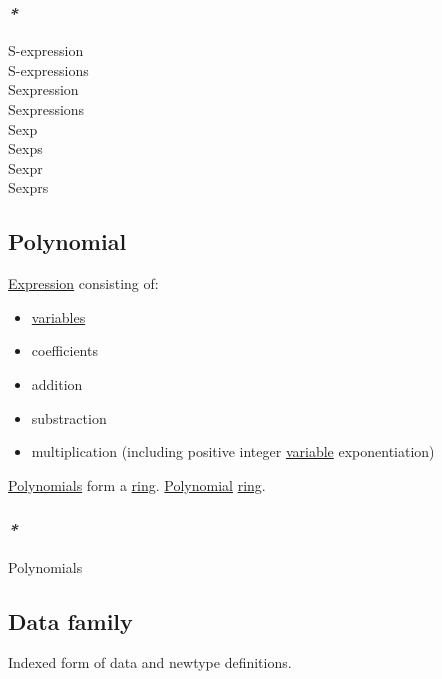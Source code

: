 \documentclass[11pt]{article}
\begin{document}
\subsubsection{\emph{*}}
\label{sec:orge13c01c}

\label{orgc524b64}S-expression\\
\label{org7d826af}S-expressions\\
\label{org4c8566f}Sexpression\\
\label{org0b06655}Sexpressions\\
\label{org6b95649}Sexp\\
\label{org65535ac}Sexps\\
\label{org1b5f4dc}Sexpr\\
\label{orgcd90110}Sexprs\\

\subsection{\label{org8d600cc}Polynomial}
\label{sec:org799bb6f}
\hyperref[org667db83]{Expression} consisting of:\\
\begin{itemize}
\item \hyperref[orgd3f3ade]{variables}\\
\item coefficients\\
\item addition\\
\item substraction\\
\item multiplication (including positive integer \hyperref[org301bab5]{variable} exponentiation)\\
\end{itemize}

\hyperref[org466f3fb]{Polynomials} form a \hyperref[org3db5758]{ring}. \hyperref[org8d600cc]{Polynomial} \hyperref[org3db5758]{ring}.\\

\subsubsection{\emph{*}}
\label{sec:org199eef2}

\label{org466f3fb}Polynomials\\

\subsection{\label{org9a64ab0}Data family}
\label{sec:org07b31d4}
Indexed form of data and newtype definitions.\\
\end{document}
